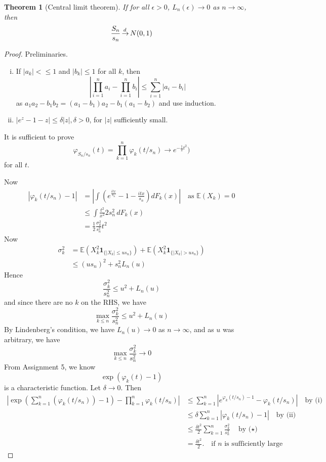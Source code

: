 \documentclass[10pt, oneside, reqno]{amsart}
\theoremstyle{plain}%
\newtheorem{thm}{Theorem}[section]
\theoremstyle{definition}
\theoremstyle{remark}
\renewcommand{\phi}{\varphi}
\newcommand{\E}{\mathbb{E}}
\def\cid{\,{\buildrel \!d \over \rightarrow}\,}
\newcommand{\indic}[1]{\mathbf{1}_{\{ #1 \}} }
\begin{document}
\begin{thm}[Central limit theorem]
    If for all $\epsilon > 0$, $L_n(\epsilon) \rightarrow 0$ as $n \rightarrow \infty$, then \[
        \frac{S_n}{s_n} \cid N(0, 1)
    \]
\end{thm}
\begin{proof}
    Preliminaries.
    \begin{enumerate}[(i)]
        \item If $|a_k| <\leq 1$ and $|b_k| \leq 1$ for all $k$, then \[
            \left| \prod_{i=1}^n a_i - \prod_{i=1}^n b_i \right| \leq \sum_{i=1}^n |a_i - b_i| 
        \] as $a_1 a_2 - b_1 b_2 = (a_1 - b_1) a_2 - b_1(a_1 - b_2)$ and use induction.  
        \item $\left|e^z - 1 - z \right| \leq \delta |z|, \delta > 0$, for $|z|$ sufficiently small.   
    \end{enumerate}
    
    It is sufficient to prove \[
        \phi_{S_n/s_n}(t) = \prod_{k=1}^n \phi_k(t/s_n) \rightarrow e^{-\frac{1}{2}t^2} \tag{$\ddag$})
    \] for all $t$.
    
    Now \begin{align*}
        |\phi_k(t/s_n) - 1| &= \left| \int (e^{\frac{itx}{s_n}} - 1 - \frac{itx}{s_n})dF_k(x) \right| \quad \text{as $\E(X_k) = 0$} \\
        &\leq \int \frac{t^2}{x^2}{2 s_n^2} \, dF_k(x) \\
        &= \frac{1}{2}\frac{\sigma_k^2}{s_n^2}t^2 \tag{$\star$}
    \end{align*}  Now \begin{align*}
        \sigma_k^2 &= \E(X_k^2 \indic{|X_k| \leq u s_n}) + \E(X_k^2 \indic{|X_k| >  u s_n}) \\
        &\leq (u s_n)^2 + s_n^2 L_n(u) 
    \end{align*} Hence \[
        \frac{\sigma_k^2}{s_n^2} \leq u^2 + L_n(u)
    \] and since there are no $k$ on the RHS, we have \[
        \max_{k \leq n} \frac{\sigma_k^2}{s_n^2} \leq u^2 + L_n(u)
    \]  By Lindenberg's condition, we have $L_n(u) \rightarrow 0$ as $n \rightarrow \infty$, and as $u$ was arbitrary, we have \[
        \max_{k \leq n} \frac{\sigma^2_k}{s_n^2} \rightarrow 0
    \] From Assignment 5, we know \[
        \exp(\phi_k(t) - 1)
    \] is a characteristic function.  Let $\delta \rightarrow 0$.  Then \begin{align*}
        \left| \exp(\sum_{k=1}^n (\phi_k(t/s_n)) - 1) - \prod_{k=1}^n \phi_k(t/s_n) \right| &\leq \sum_{k=1}^n \left| e^{\phi_k(t/s_n) - 1} - \phi_k(t/s_n) \right| \quad \text{by (i)} \\
        &\leq \delta \sum_{k=1}^n \left|\phi_k(t/s_n) - 1 \right| \quad \text{by (ii)} \\
        &\leq \frac{\delta t^2}{2}{\sum_{k=1}^n \frac{\sigma_k^2}{s_n^2}} \quad \text{by ($\star$)} \\
        &= \frac{\delta t^2}{2}. \quad \text{if $n$ is sufficiently large}
    \end{align*}
    

\end{proof}
\end{document}

